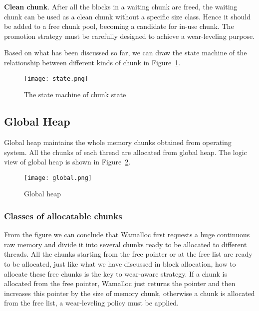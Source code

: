 \documentclass{vldb}
\begin{document}
\textbf{Clean chunk}.
After all the blocks in a waiting chunk are freed, the waiting chunk can be used as a clean chunk without a specific size class.
Hence it should be added to a free chunk pool, becoming a candidate for in-use chunk.
The promotion strategy must be carefully designed to achieve a wear-leveling purpose.

Based on what has been discussed so far,
we can draw the state machine of the relationship between different kinds of chunk in Figure~\ref{fig:state}.

\begin{figure}[h]
\centering
\texttt{[image: state.png]}
\caption{The state machine of chunk state}
\label{fig:state}
\end{figure}

\subsection{Global Heap}

Global heap maintains the whole memory chunks obtained from operating system. 
All the chunks of each thread are allocated from global heap. 
The logic view of global heap is shown in Figure~\ref{fig:global}.

\begin{figure}[h]
\centering
\texttt{[image: global.png]}
\caption{Global heap }
\label{fig:global}
\end{figure}

\subsubsection{Classes of allocatable chunks}
From the figure we can conclude that Wamalloc first requests a huge continuous raw memory and divide it into several chunks ready to be allocated to different threads.
All the chunks starting from the free pointer or at the free list are ready to be allocated, 
just like what we have discussed in block allocation, how to allocate these free chunks is the key to wear-aware strategy.
If a chunk is allocated from the free pointer, Wamalloc just returns the pointer and then increases this pointer by the size of memory chunk, 
otherwise a chunk is allocated from the free list, a wear-leveling policy must be applied.
\end{document}
